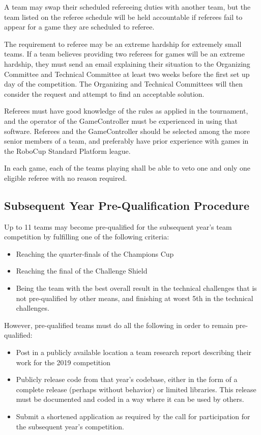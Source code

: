 A team may swap their scheduled refereeing duties with another team, but the team listed on the referee schedule will be held accountable if referees fail to appear for a game they are scheduled to referee.

The requirement to referee may be an extreme hardship for extremely small teams.  If a team believes providing two referees for games will be an extreme hardship, they must send an email explaining their situation to the Organizing Committee and Technical Committee at least two weeks before the first set up day of the competition.  The Organizing and Technical Committees will then consider the request and attempt to find an acceptable solution.

Referees must have good knowledge of the rules as applied in the tournament, and the operator of the GameController must be experienced in using that software. Referees and the GameController should be selected among the more senior members of a team, and preferably have prior experience with games in the RoboCup Standard Platform league.

In each game, each of the teams playing shall be able to veto one and only one eligible referee with no reason required.


\subsection{Subsequent Year Pre-Qualification Procedure}
\label{sec:preQual}
Up to 11 teams may become pre-qualified for the subsequent year's team competition by fulfilling one of the following criteria:
\begin{itemize}
    \item Reaching the quarter-finals of the Champions Cup
    \item Reaching the final of the Challenge Shield
    \item Being the team with the best overall result in the technical challenges that is not pre-qualified by other means, and finishing at worst 5th in the technical challenges.
\end{itemize}

However, pre-qualified teams must do all the following in order to remain pre-qualified:
\begin{itemize}
\item Post in a publicly available location a team research report describing their work for the 2019 competition
\item Publicly release code from that year's codebase, either in the form of a complete release (perhaps without behavior) or limited libraries.  This release must be documented and coded in a way where it can be used by others.
\item Submit a shortened application as required by the call for participation for the subsequent year's competition.
\end{itemize}

